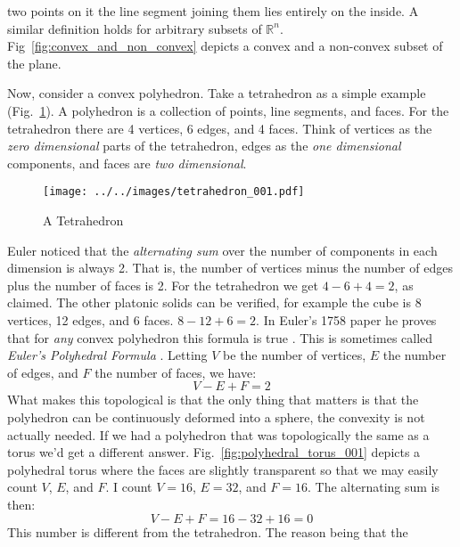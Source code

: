     two points on it the line segment joining them lies entirely on the inside.
    A similar definition holds for arbitrary subsets of $\mathbb{R}^{n}$.
    Fig~\ref{fig:convex_and_non_convex} depicts a convex and a non-convex
    subset of the plane.
    \par\hfill\par
    Now, consider a convex polyhedron. Take a tetrahedron as a simple
    example (Fig.~\ref{fig:tetrahedron_001}). A polyhedron is a collection of
    points, line segments, and faces. For the tetrahedron there are 4 vertices,
    6 edges, and 4 faces. Think of vertices as the
    \textit{zero dimensional} parts of the tetrahedron, edges as the
    \textit{one dimensional} components, and faces are \textit{two dimensional}.
    \begin{figure}[H]
        \centering
        \texttt{[image: ../../images/tetrahedron\_001.pdf]}
        \caption{A Tetrahedron}
        \label{fig:tetrahedron_001}
    \end{figure}
    Euler noticed that the \textit{alternating sum} over the number
    of components in each dimension is always 2. That is, the number of
    vertices minus the number of edges plus the number of faces is 2. For the
    tetrahedron we get $4-6+4=2$, as claimed. The other platonic solids can be
    verified, for example the cube is 8 vertices, 12 edges, and 6 faces.
    $8-12+6=2$. In Euler's 1758 paper he proves that for \textit{any} convex
    polyhedron this formula is true \cite{LeonhardEulerPolyhedraFormula}. This
    is sometimes called \textit{Euler's Polyhedral Formula}%
    . Letting $V$ be the
    number of vertices, $E$ the number of edges, and $F$ the number of faces,
    we have:
    \begin{equation}
        V-E+F=2
    \end{equation}
    What makes this topological is that the only thing that matters is that the
    polyhedron can be continuously deformed into a sphere, the convexity is not
    actually needed. If we had a polyhedron that was topologically the same as
    a torus we'd get a different answer.
    Fig.~\ref{fig:polyhedral_torus_001} depicts a polyhedral torus where the
    faces are slightly transparent so that we may easily count $V$, $E$, and
    $F$. I count $V=16$, $E=32$, and $F=16$. The alternating sum is then:
    \begin{equation}
        V-E+F=16-32+16=0
    \end{equation}
    This number is different from the tetrahedron. The reason being that the
